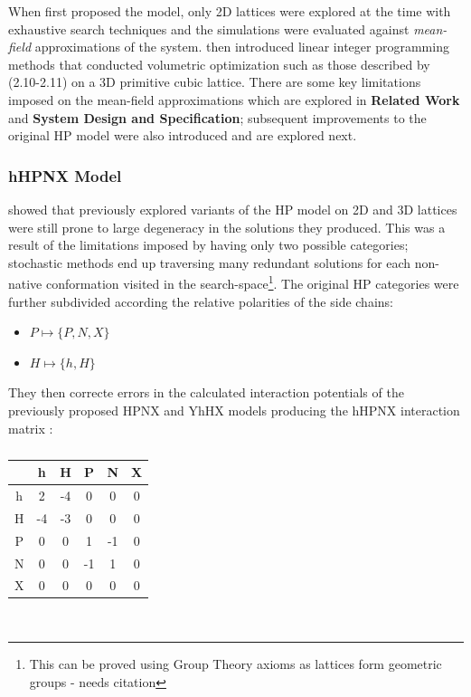 When \cite{Lau1989} first proposed the model, only 2D lattices were explored at the time with
exhaustive search techniques and the simulations were evaluated
against \emph{mean-field} approximations of the system. \cite{Yue} then introduced linear integer programming methods
that conducted volumetric optimization such as those described by (2.10-2.11) 
on a 3D primitive cubic lattice. There are some key limitations imposed on the mean-field
approximations which are explored in \textbf{Related Work} and \textbf{System Design and Specification};
subsequent improvements to the original HP model were also introduced and are explored next.

\subsubsection{hHPNX Model}
\cite{Hoque} showed that previously explored variants of the HP model on 2D and 3D
lattices were still prone to large degeneracy in the solutions they produced. This was
a result of the limitations imposed by having only two possible categories; stochastic
methods end up traversing many redundant solutions for each non-native conformation visited
in the search-space\footnote{This can be proved using Group Theory axioms as lattices form geometric groups - needs citation}.
The original HP categories were further subdivided according the relative polarities of
the side chains:
\begin{itemize}
    \item $P \mapsto \{P, N, X\}$ 
    \item $H \mapsto \{h, H\}$
\end{itemize}
They then correcte errors in the calculated interaction potentials
of the previously proposed HPNX and YhHX models \cite{BornbergBauer1997} producing
the hHPNX interaction matrix :
\begin{table}[!htb]
    \begin{center}
        \caption{}
        \begin{tabular}{|c || c | c | c | c | c|}
            \hline
             & h & H & P & N & X \\
            \hline
            h & 2 & -4 & 0 & 0 & 0 \\
            \hline
            H & -4 & -3 & 0 & 0 & 0 \\
            \hline
            P & 0 & 0 & 1 & -1 & 0\\
            \hline
            N & 0 & 0 & -1 & 1 & 0\\
            \hline
            X & 0 & 0 & 0 & 0 & 0\\ 
            \hline
        \end{tabular}
    \end{center}
\end{table}\\
